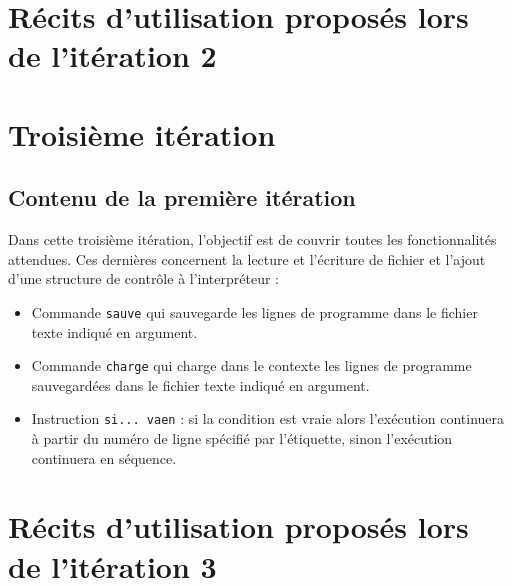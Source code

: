     \footnotesize
    \chapter*{Récits d'utilisation proposés lors de l'itération 2}
    
    \newpage
    
    
    
    
    
    
    
    
    
    

    \large
    \chapter{Troisième itération}
    \section*{Contenu de la première itération}
    Dans cette troisième itération, l'objectif est de couvrir toutes
    les fonctionnalités attendues. Ces dernières  concernent la
    lecture et l'écriture de fichier et l'ajout d'une structure de
    contrôle à l'interpréteur :
    \begin{itemize}
        \item Commande \verb|sauve| qui sauvegarde les lignes de
              programme dans le fichier texte indiqué en argument.
        \item Commande \verb|charge| qui charge dans le contexte
              les lignes de programme sauvegardées dans le fichier
              texte indiqué en argument.
        \item Instruction \verb|si... vaen| : si la condition est
              vraie alors l'exécution continuera à partir du numéro
              de ligne spécifié par l’étiquette, sinon l'exécution
              continuera en séquence.
    \end{itemize}

    \footnotesize
    \chapter*{Récits d'utilisation proposés lors de l'itération 3}
    
    \newpage
    
    
